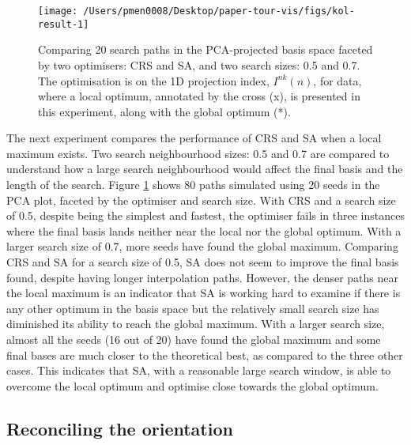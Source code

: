 \begin{Schunk}
\begin{figure}

{\centering \texttt{[image: /Users/pmen0008/Desktop/paper-tour-vis/figs/kol-result-1]} 

}

\caption[Comparing 20 search paths in the PCA-projected basis space faceted by two optimisers]{Comparing 20 search paths in the PCA-projected basis space faceted by two optimisers: CRS and SA, and two search sizes: 0.5 and 0.7. The optimisation is on the 1D projection index, $I^{nk}(n)$, for  data, where a local optimum, annotated by the cross (x), is presented in this experiment, along with the global optimum (*).}\label{fig:kol-result}
\end{figure}
\end{Schunk}

The next experiment compares the performance of CRS and SA when a local
maximum exists. Two search neighbourhood sizes: 0.5 and 0.7 are compared
to understand how a large search neighbourhood would affect the final
basis and the length of the search. Figure \ref{fig:kol-result} shows 80
paths simulated using 20 seeds in the PCA plot, faceted by the optimiser
and search size. With CRS and a search size of 0.5, despite being the
simplest and fastest, the optimiser fails in three instances where the
final basis lands neither near the local nor the global optimum. With a
larger search size of 0.7, more seeds have found the global maximum.
Comparing CRS and SA for a search size of 0.5, SA does not seem to
improve the final basis found, despite having longer interpolation
paths. However, the denser paths near the local maximum is an indicator
that SA is working hard to examine if there is any other optimum in the
basis space but the relatively small search size has diminished its
ability to reach the global maximum. With a larger search size, almost
all the seeds (16 out of 20) have found the global maximum and some
final bases are much closer to the theoretical best, as compared to the
three other cases. This indicates that SA, with a reasonable large
search window, is able to overcome the local optimum and optimise close
towards the global optimum.

\hypertarget{reconciling-the-orientation}{%
\subsection{Reconciling the
orientation}\label{reconciling-the-orientation}}

